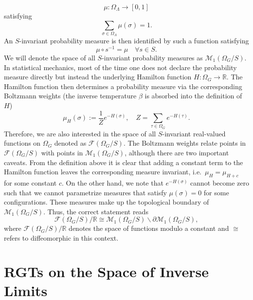 \documentclass{article}
\begin{document}
\begin{equation}
    \mu:\Omega_\Lambda\to[0,1]
\end{equation}
satisfying
\begin{equation}
    \sum_{\sigma\in\Omega_\Lambda}\mu(\sigma)=1.
\end{equation}
An $S$-invariant probability measure is then identified by such a function satisfying
\begin{equation}
    \mu\circ s^{-1}=\mu\quad\forall s\in S.
\end{equation}
We will denote the space of all $S$-invariant probability measures as $\mathscr{M}_1(\Omega_G/S)$. In statistical mechanics, most of the time one does not declare the probability measure directly but instead the underlying Hamilton function $H:\Omega_G\to\mathds{R}$. The Hamilton function then determines a probability measure via the corresponding Boltzmann weights (the inverse temperature $\beta$ is absorbed into the definition of $H$)
\begin{equation}
    \mu_H(\sigma):=\frac{1}{Z}e^{-H(\sigma)},\quad Z=\sum_{\tau\in\Omega_G}e^{-H(\tau)}.
\end{equation}
Therefore, we are also interested in the space of all $S$-invariant real-valued functions on $\Omega_G$ denoted as $\mathcal{F}(\Omega_G/S)$. The Boltzmann weights relate points in $\mathcal{F}(\Omega_G/S)$ with points in $\mathscr{M}_1(\Omega_G/S)$, although there are two important caveats. From the definition above it is clear that adding a constant term to the Hamilton function leaves the corresponding measure invariant, i.e.\ $\mu_H=\mu_{H+c}$ for some constant $c$. On the other hand, we note that $e^{-H(\sigma)}$ cannot become zero such that we cannot parametrize measures that satisfy $\mu(\sigma)=0$ for some configurations. These measures make up the topological boundary of $\mathscr{M}_1(\Omega_G/S)$. Thus, the correct statement reads
\begin{equation}
    \mathcal{F}(\Omega_G/S)/\mathds{R}\cong\mathscr{M}_1(\Omega_G/S)\backslash\partial\mathscr{M}_1(\Omega_G/S),
\end{equation}
where $\mathcal{F}(\Omega_G/S)/\mathds{R}$ denotes the space of functions modulo a constant and $\cong$ refers to diffeomorphic in this context. 


\section{RGTs on the Space of Inverse Limits}\label{Sec2}
\end{document}
